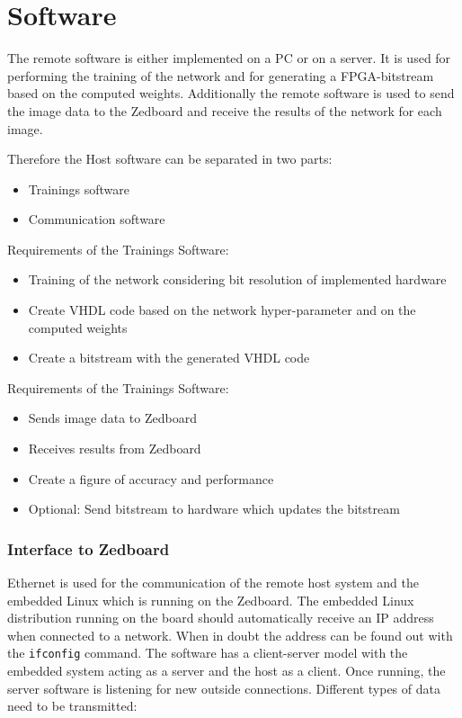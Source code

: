 \section{Software}

The remote software is either implemented on a PC or on a server. It is used for performing the training of the network and for generating a FPGA-bitstream based on the computed weights. Additionally the remote software is used to send the image data to the Zedboard and receive the results of the network for each image. 

Therefore the Host software can be separated in two parts:
\begin{itemize}
	\item Trainings software
	\item Communication software
\end{itemize} 

Requirements of the Trainings Software:
\begin{itemize} 
	\item Training of the network considering bit resolution of implemented hardware
	\item Create VHDL code based on the network hyper-parameter and on the computed weights
	\item Create a bitstream with the generated VHDL code
\end{itemize}

Requirements of the Trainings Software:
\begin{itemize}
	\item Sends image data to Zedboard
	\item Receives results from Zedboard
	\item Create a figure of accuracy and performance   
	\item Optional: Send bitstream to hardware which updates the bitstream 
\end{itemize}

\subsubsection{Interface to Zedboard} \label{subsec:InterfaceRemoteZed}
Ethernet is used for the communication of the remote host system and the embedded Linux which is running on the Zedboard. 
The embedded Linux distribution running on the board should automatically receive an IP address when connected to a network. When in doubt the address can be found out with the \texttt{ifconfig} command. 
The software has a client-server model with the embedded system acting as a server and the host as a client. Once running, the server software is listening for new outside connections. Different types of data need to be transmitted:

